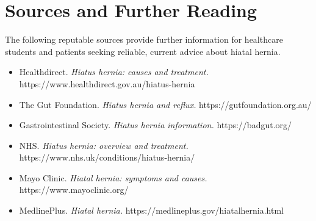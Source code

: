 \section*{Sources and Further Reading}
The following reputable sources provide further information for healthcare students and patients seeking reliable, current advice about hiatal hernia.

\begin{itemize}
    \item Healthdirect. \textit{Hiatus hernia: causes and treatment.} https://www.healthdirect.gov.au/hiatus-hernia
    \item The Gut Foundation. \textit{Hiatus hernia and reflux.} https://gutfoundation.org.au/
    \item Gastrointestinal Society. \textit{Hiatus hernia information.} https://badgut.org/
    \item NHS. \textit{Hiatus hernia: overview and treatment.} https://www.nhs.uk/conditions/hiatus-hernia/
    \item Mayo Clinic. \textit{Hiatal hernia: symptoms and causes.} https://www.mayoclinic.org/
    \item MedlinePlus. \textit{Hiatal hernia.} https://medlineplus.gov/hiatalhernia.html
\end{itemize}
